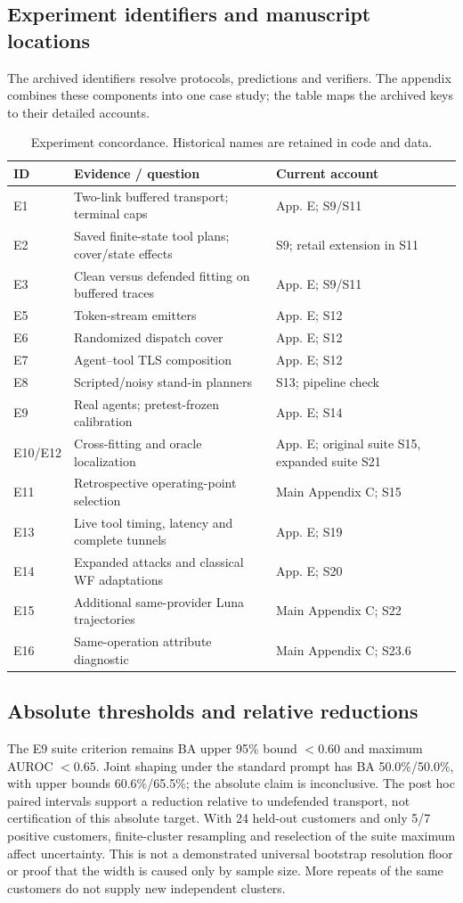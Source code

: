 \subsection{Experiment identifiers and manuscript locations}
The archived identifiers resolve protocols, predictions and verifiers. The appendix combines these components into one case study; the table maps the archived keys to their detailed accounts.
\begin{table}[!ht]\centering\footnotesize
\caption{Experiment concordance. Historical names are retained in code and data.}\label{tab:experiment-concordance}
\begin{tabularx}{\columnwidth}{@{}lYY@{}}\toprule
ID & Evidence / question & Current account\\\midrule
E1 & Two-link buffered transport; terminal caps & App. E; S9/S11\\
E2 & Saved finite-state tool plans; cover/state effects & S9; retail extension in S11\\
E3 & Clean versus defended fitting on buffered traces & App. E; S9/S11\\
E5 & Token-stream emitters & App. E; S12\\
E6 & Randomized dispatch cover & App. E; S12\\
E7 & Agent--tool TLS composition & App. E; S12\\
E8 & Scripted/noisy stand-in planners & S13; pipeline check\\
E9 & Real agents; pretest-frozen calibration & App. E; S14\\
E10/E12 & Cross-fitting and oracle localization & App. E; original suite S15, expanded suite S21\\
E11 & Retrospective operating-point selection & Main Appendix C; S15\\
E13 & Live tool timing, latency and complete tunnels & App. E; S19\\
E14 & Expanded attacks and classical WF adaptations & App. E; S20\\
E15 & Additional same-provider Luna trajectories & Main Appendix C; S22\\
E16 & Same-operation attribute diagnostic & Main Appendix C; S23.6\\
\bottomrule\end{tabularx}\end{table}

\subsection{Absolute thresholds and relative reductions}
The E9 suite criterion remains BA upper 95\% bound $<0.60$ and maximum AUROC $<0.65$. Joint shaping under the standard prompt has BA 50.0\%/50.0\%, with upper bounds 60.6\%/65.5\%; the absolute claim is inconclusive. The post hoc paired intervals support a reduction relative to undefended transport, not certification of this absolute target. With 24 held-out customers and only 5/7 positive customers, finite-cluster resampling and reselection of the suite maximum affect uncertainty. This is not a demonstrated universal bootstrap resolution floor or proof that the width is caused only by sample size. More repeats of the same customers do not supply new independent clusters.

